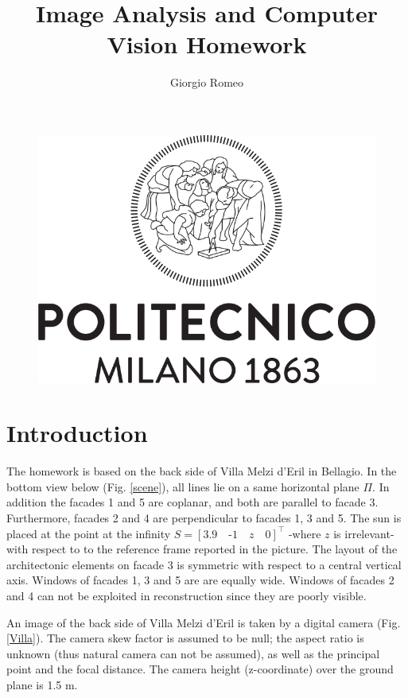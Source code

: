 \documentclass[11pt, oneside]{article}
\title{Image Analysis and Computer Vision Homework}
\author{Giorgio Romeo}
\affil{Politecnico di Milano \\ A.Y. 2021/2022}
\begin{document}
\maketitle

\begin{figure}[!b]
	\centering
	\includegraphics[width=0.7\linewidth]{Logo_Politecnico_Milano.png}
	\label{logo}
\end{figure}

\pagebreak
\tableofcontents
\pagebreak

\section{Introduction}
The homework is based on the back side of Villa Melzi d’Eril in Bellagio. In the bottom view below (Fig. \ref{scene}), all lines lie on a same horizontal plane $\Pi$. In addition the facades 1 and 5 are coplanar, and both are parallel to facade 3. Furthermore, facades 2 and 4 are perpendicular to facades 1, 3 and 5. The sun is placed at the point at the infinity
$ S = [3.9\quad \text{-} 1\quad z\quad 0]^\intercal $
-where $z$ is irrelevant- with respect to to the reference frame reported in the picture. The layout of the architectonic elements on facade 3 is symmetric with respect to a central vertical axis. Windows of facades 1, 3 and 5 are are equally wide. Windows of facades 2 and 4 can not be exploited in reconstruction since they are poorly visible.

An image of the back side of Villa Melzi d’Eril is taken by a digital camera (Fig. \ref{Villa}). The camera skew factor is assumed to be null; the aspect ratio is unknown (thus natural camera can not be assumed), as well as the principal point and the focal distance. The camera height (z-coordinate) over the ground plane is 1.5 m.\\
\end{document}
